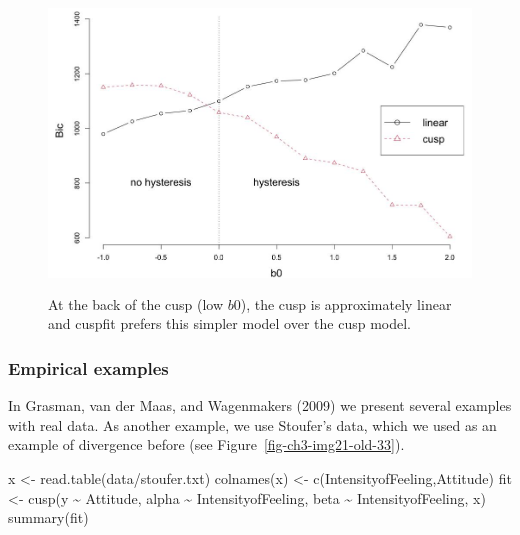 \documentclass[
  letterpaper,
]{scrbook}
\newenvironment{Shaded}{\begin{snugshade}}{\end{snugshade}}
\newcommand{\FunctionTok}[1]{\textcolor[rgb]{0.28,0.35,0.67}{#1}}
\newcommand{\NormalTok}[1]{\textcolor[rgb]{0.00,0.23,0.31}{#1}}
\newcommand{\OtherTok}[1]{\textcolor[rgb]{0.00,0.23,0.31}{#1}}
\newcommand{\SpecialCharTok}[1]{\textcolor[rgb]{0.37,0.37,0.37}{#1}}
\newcommand{\StringTok}[1]{\textcolor[rgb]{0.13,0.47,0.30}{#1}}
\begin{document}
\begin{figure}

{\centering \includegraphics[width=4.82519in,height=3.07592in]{media/ch3/image23.jpg}

}

\caption{\label{fig-ch3-img23-old-35}At the back of the cusp (low
\(b0\)), the cusp is approximately linear and cuspfit prefers this
simpler model over the cusp model.}

\end{figure}

\hypertarget{empirical-examples}{%
\subsubsection{Empirical examples}\label{empirical-examples}}

In Grasman, van der Maas, and Wagenmakers (2009) we present several
examples with real data. As another example, we use Stoufer's data,
which we used as an example of divergence before (see
Figure~\ref{fig-ch3-img21-old-33}).

\begin{Shaded}
\begin{Highlighting}[]
\NormalTok{x }\OtherTok{\textless{}{-}} \FunctionTok{read.table}\NormalTok{(}\StringTok{\textquotesingle{}data/stoufer.txt\textquotesingle{}}\NormalTok{)}
\FunctionTok{colnames}\NormalTok{(x) }\OtherTok{\textless{}{-}} \FunctionTok{c}\NormalTok{(}\StringTok{\textquotesingle{}IntensityofFeeling\textquotesingle{}}\NormalTok{,}\StringTok{\textquotesingle{}Attitude\textquotesingle{}}\NormalTok{)}
\NormalTok{fit }\OtherTok{\textless{}{-}} \FunctionTok{cusp}\NormalTok{(y }\SpecialCharTok{\textasciitilde{}}\NormalTok{ Attitude, alpha }\SpecialCharTok{\textasciitilde{}}\NormalTok{ IntensityofFeeling, beta }\SpecialCharTok{\textasciitilde{}}\NormalTok{ IntensityofFeeling, x)}
\FunctionTok{summary}\NormalTok{(fit)}
\end{Highlighting}
\end{Shaded}
\end{document}
